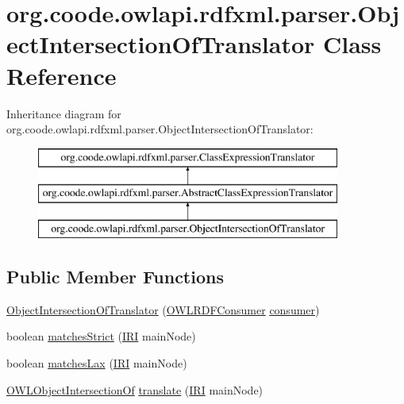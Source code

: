 \hypertarget{classorg_1_1coode_1_1owlapi_1_1rdfxml_1_1parser_1_1_object_intersection_of_translator}{\section{org.\-coode.\-owlapi.\-rdfxml.\-parser.\-Object\-Intersection\-Of\-Translator Class Reference}
\label{classorg_1_1coode_1_1owlapi_1_1rdfxml_1_1parser_1_1_object_intersection_of_translator}
}
Inheritance diagram for org.\-coode.\-owlapi.\-rdfxml.\-parser.\-Object\-Intersection\-Of\-Translator\-:\begin{figure}[H]
\begin{center}
\leavevmode
\includegraphics[height=3.000000cm]{classorg_1_1coode_1_1owlapi_1_1rdfxml_1_1parser_1_1_object_intersection_of_translator}
\end{center}
\end{figure}
\subsection*{Public Member Functions}
\begin{DoxyCompactItemize}
\item 
\hyperlink{classorg_1_1coode_1_1owlapi_1_1rdfxml_1_1parser_1_1_object_intersection_of_translator_a7ac489fa6a0a4dc6a85f78cc9eb73656}{Object\-Intersection\-Of\-Translator} (\hyperlink{classorg_1_1coode_1_1owlapi_1_1rdfxml_1_1parser_1_1_o_w_l_r_d_f_consumer}{O\-W\-L\-R\-D\-F\-Consumer} \hyperlink{classorg_1_1coode_1_1owlapi_1_1rdfxml_1_1parser_1_1_abstract_class_expression_translator_ae547084cdd5b92c03835b5aa404f823b}{consumer})
\item 
boolean \hyperlink{classorg_1_1coode_1_1owlapi_1_1rdfxml_1_1parser_1_1_object_intersection_of_translator_a3ae89aab5e98d36c7d8e53b3eba6a403}{matches\-Strict} (\hyperlink{classorg_1_1semanticweb_1_1owlapi_1_1model_1_1_i_r_i}{I\-R\-I} main\-Node)
\item 
boolean \hyperlink{classorg_1_1coode_1_1owlapi_1_1rdfxml_1_1parser_1_1_object_intersection_of_translator_a86bc051c18268d248984ff1a7b8a59b0}{matches\-Lax} (\hyperlink{classorg_1_1semanticweb_1_1owlapi_1_1model_1_1_i_r_i}{I\-R\-I} main\-Node)
\item 
\hyperlink{interfaceorg_1_1semanticweb_1_1owlapi_1_1model_1_1_o_w_l_object_intersection_of}{O\-W\-L\-Object\-Intersection\-Of} \hyperlink{classorg_1_1coode_1_1owlapi_1_1rdfxml_1_1parser_1_1_object_intersection_of_translator_a30cbeab582292c060bda6d4f547549e3}{translate} (\hyperlink{classorg_1_1semanticweb_1_1owlapi_1_1model_1_1_i_r_i}{I\-R\-I} main\-Node)
\end{DoxyCompactItemize}
